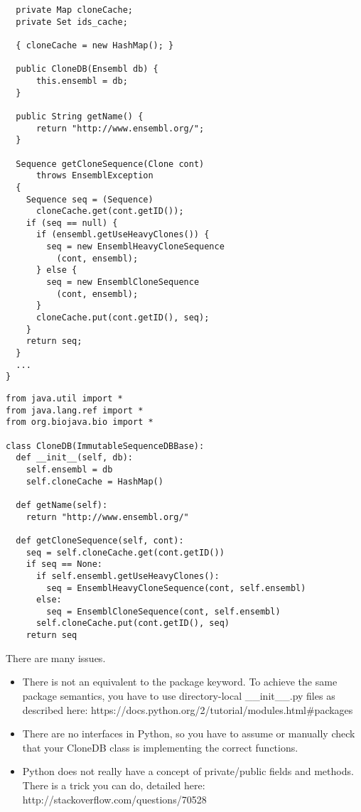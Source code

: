 \documentclass[10pt]{article}
\begin{document}
\begin{enumerate}
\begin{multicols}{2}
\begin{verbatim}
  private Map cloneCache;
  private Set ids_cache;

  { cloneCache = new HashMap(); }

  public CloneDB(Ensembl db) {
      this.ensembl = db;
  }

  public String getName() {
      return "http://www.ensembl.org/";
  }

  Sequence getCloneSequence(Clone cont)
      throws EnsemblException
  {
    Sequence seq = (Sequence)
      cloneCache.get(cont.getID());
    if (seq == null) {
      if (ensembl.getUseHeavyClones()) {
        seq = new EnsemblHeavyCloneSequence
          (cont, ensembl);
      } else {
        seq = new EnsemblCloneSequence
          (cont, ensembl);
      }
      cloneCache.put(cont.getID(), seq);
    }
    return seq;
  }
  ...
}
\end{verbatim}
\begin{verbatim}
from java.util import *
from java.lang.ref import *
from org.biojava.bio import *

class CloneDB(ImmutableSequenceDBBase):
  def __init__(self, db):
    self.ensembl = db
    self.cloneCache = HashMap()

  def getName(self):
    return "http://www.ensembl.org/"

  def getCloneSequence(self, cont):
    seq = self.cloneCache.get(cont.getID())
    if seq == None:
      if self.ensembl.getUseHeavyClones():
        seq = EnsemblHeavyCloneSequence(cont, self.ensembl)
      else:
        seq = EnsemblCloneSequence(cont, self.ensembl)
      self.cloneCache.put(cont.getID(), seq)
    return seq
\end{verbatim}
\end{multicols}

        There are many issues.
        \begin{itemize}
                \item There is not an equivalent to the package keyword. To achieve the same
                package semantics, you have to use directory-local \_\_init\_\_.py files as
                described here: https://docs.python.org/2/tutorial/modules.html\#packages

                \item There are no interfaces in Python, so you have to assume or manually check
                that your CloneDB class is implementing the correct functions.

                \item Python does not really have a concept of private/public fields and methods.
                There is a trick you can do, detailed here:
                http://stackoverflow.com/questions/70528


\end{itemize}
\end{enumerate}
\end{document}
